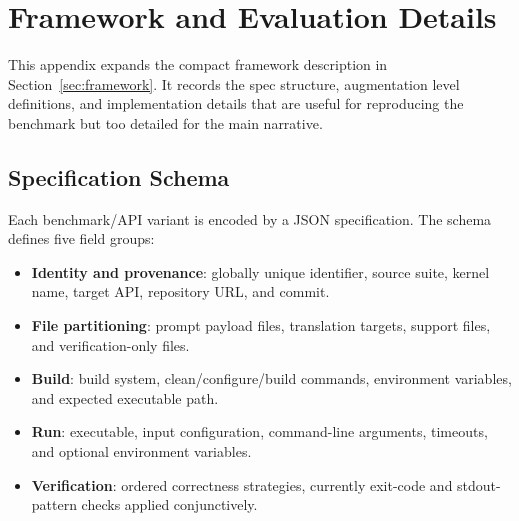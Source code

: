 


\section{Framework and Evaluation Details}
\label{sec:appendix-framework}

This appendix expands the compact framework description in
Section~\ref{sec:framework}. It records the spec structure, augmentation level
definitions, and implementation details that are useful for reproducing the
benchmark but too detailed for the main narrative.

\subsection{Specification Schema}
\label{sec:appendix-framework-schema}

Each benchmark/API variant is encoded by a JSON specification. The schema
defines five field groups:

\begin{itemize}
  \item \textbf{Identity and provenance}: globally unique identifier, source
  suite, kernel name, target API, repository URL, and commit.
  \item \textbf{File partitioning}: prompt payload files, translation targets,
  support files, and verification-only files.
  \item \textbf{Build}: build system, clean/configure/build commands,
  environment variables, and expected executable path.
  \item \textbf{Run}: executable, input configuration, command-line arguments,
  timeouts, and optional environment variables.
  \item \textbf{Verification}: ordered correctness strategies, currently
  exit-code and stdout-pattern checks applied conjunctively.
\end{itemize}


